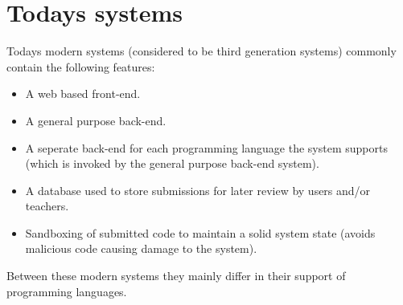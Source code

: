 \section{Todays systems} \label{sec:todays_systems}
Todays modern systems \cite{Gradebot} \cite{GenerationReview}  \cite{Kattis} \cite{Amelung} (considered to be third generation systems) commonly contain the following features:
\begin{itemize}
	\item A web based front-end.
	\item A general purpose back-end.
	\item A seperate back-end for each programming language the system supports (which is invoked by the general purpose back-end system).
	\item A database used to store submissions for later review by users and/or teachers.
	\item Sandboxing of submitted code to maintain a solid system state (avoids malicious code causing damage to the system). 
\end{itemize}
Between these modern systems they mainly differ in their support of programming languages.
